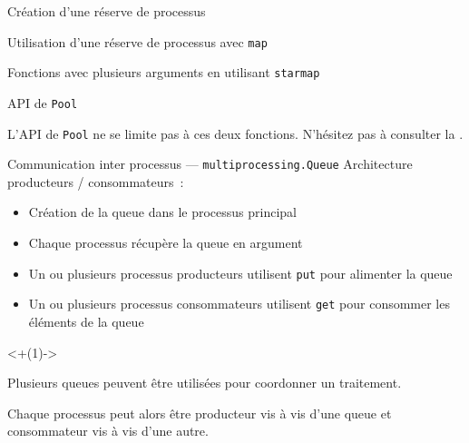 \begin{frame}{Création d'une réserve de processus}


\end{frame}

\begin{frame}{Utilisation d'une réserve de processus avec \texttt{map}}


\end{frame}

\begin{frame}{Fonctions avec plusieurs arguments en utilisant \texttt{starmap}}


\end{frame}

\begin{frame}{API de \texttt{Pool}}

  L'API de \texttt{Pool} ne se limite pas à ces deux fonctions. N'hésitez pas à consulter la .

\end{frame}

\begin{frame}{Communication inter processus --- \texttt{multiprocessing.Queue}}
  Architecture producteurs / consommateurs~:

  \begin{itemize}[<+(1)->]
    \item Création de la queue dans le processus principal
    \item Chaque processus récupère la queue en argument
    \item Un ou plusieurs processus producteurs utilisent \texttt{put} pour alimenter la queue
    \item Un ou plusieurs processus consommateurs utilisent \texttt{get} pour consommer les éléments de la queue
  \end{itemize}

  \onslide<+(1)->{Plusieurs queues peuvent être utilisées pour coordonner un traitement.

  Chaque processus peut alors être producteur vis à vis d'une queue et consommateur vis à vis d'une autre.}
\end{frame}

